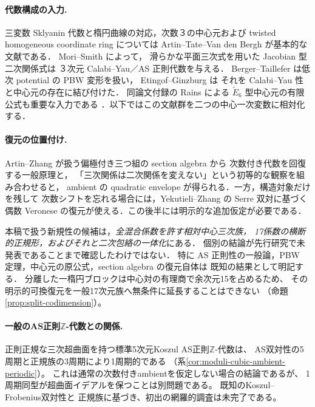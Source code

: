 \documentclass[11pt,a4paper]{ltjsarticle}
\numberwithin{equation}{section}
\begin{document}
\paragraph{代数構成の入力.}
三変数 Sklyanin 代数と楕円曲線の対応，次数３の中心元および
twisted homogeneous coordinate ring については
Artin--Tate--Van den Bergh \cite{ATV} が基本的な文献である．
Mori--Smith \cite[Theorem~4.2(1)]{MS} によって，
滑らかな平面三次式を用いた Jacobian 型二次関係式は
３次元 Calabi--Yau／AS 正則代数を与える．
Berger--Taillefer \cite{BT} は低次 potential の PBW 変形を扱い，
Etingof--Ginzburg \cite[Proposition~7.3.1(ii), Theorem~3.3.2]{EG} は
それを Calabi--Yau 性と中心元の存在に結び付けた．
同論文付録の Rains による $\widetilde E_6$ 型中心元の有限公式も重要な入力である
\cite[\S9.1]{EG}．以下ではこの文献群を二つの中心一次変数に相対化する．

\paragraph{復元の位置付け.}
Artin--Zhang \cite{AZ} が扱う偏極付き三つ組の section algebra から
次数付き代数を回復する一般原理と，
「三次関係は二次関係を変えない」という初等的な観察を組み合わせると，
ambient の quadratic envelope が得られる．一方，構造対象だけを残して
次数シフトを忘れる場合には，Yekutieli--Zhang \cite{YZ} の Serre 双対に基づく
偶数 Veronese の復元が使える．この後半には明示的な追加仮定が必要である．

本稿で扱う新規性の候補は，\emph{全混合係数を許す相対中心三次族，
17係数の横断的正規形，およびそれと二次包絡の一体化}にある．
個別の結論が先行研究で未発表であることまで確認したわけではない．
特に AS 正則性の一般論，PBW 定理，中心元の原公式，section algebra の復元自体は
既知の結果として明記する．
分離した一楕円ブロックは中心対の有理商で余次元15を占めるため、
その明示的可換復元を一般17次元族へ無条件に延長することはできない
（命題\ref{prop:split-codimension}）。

\paragraph{一般のAS正則$\mathbb Z$-代数との関係.}
正則正規な三次超曲面を持つ標準5次元Koszul AS正則$\mathbb Z$-代数は、
AS双対性の5周期と正規族の3周期により1周期的である
（系\ref{cor:moduli-cubic-ambient-periodic}）。
これは通常の次数付きambientを仮定しない場合の結論であるが、
1周期同型が超曲面イデアルを保つことは別問題である。
既知のKoszul--Frobenius双対性\cite{PBondalPolishchukHelices}と
正規族\cite{PChanNymanNormalFamily}に基づき、初出の網羅的調査は未完了である。
\end{document}
